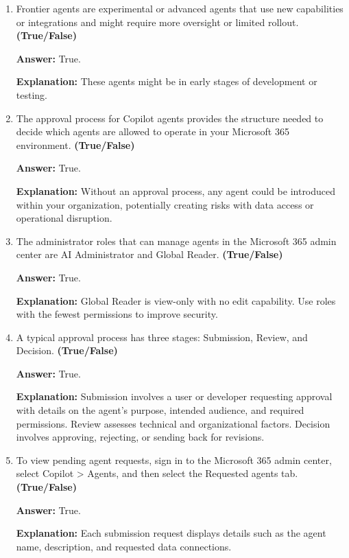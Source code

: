 \documentclass[10pt]{article}
\begin{document}
\begin{enumerate}[leftmargin=*]
\textbf{Answer:} True.

\textbf{Explanation:} These prebuilt agents include Researcher, Analyst, Writing Coach, and so on.

\item Frontier agents are experimental or advanced agents that use new capabilities or integrations and might require more oversight or limited rollout. \textbf{(True/False)}

\textbf{Answer:} True.

\textbf{Explanation:} These agents might be in early stages of development or testing.

\item The approval process for Copilot agents provides the structure needed to decide which agents are allowed to operate in your Microsoft 365 environment. \textbf{(True/False)}

\textbf{Answer:} True.

\textbf{Explanation:} Without an approval process, any agent could be introduced within your organization, potentially creating risks with data access or operational disruption.

\item The administrator roles that can manage agents in the Microsoft 365 admin center are AI Administrator and Global Reader. \textbf{(True/False)}

\textbf{Answer:} True.

\textbf{Explanation:} Global Reader is view-only with no edit capability. Use roles with the fewest permissions to improve security.

\item A typical approval process has three stages: Submission, Review, and Decision. \textbf{(True/False)}

\textbf{Answer:} True.

\textbf{Explanation:} Submission involves a user or developer requesting approval with details on the agent’s purpose, intended audience, and required permissions. Review assesses technical and organizational factors. Decision involves approving, rejecting, or sending back for revisions.

\item To view pending agent requests, sign in to the Microsoft 365 admin center, select Copilot > Agents, and then select the Requested agents tab. \textbf{(True/False)}

\textbf{Answer:} True.

\textbf{Explanation:} Each submission request displays details such as the agent name, description, and requested data connections.


\end{enumerate}
\end{document}

